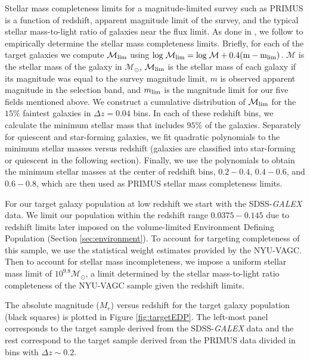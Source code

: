 \documentclass{emulateapj}
\begin{document}
Stellar mass completeness limits for a magnitude-limited 
survey such as PRIMUS is a function of redshift, apparent 
magnitude limit of the survey, and the typical stellar 
mass-to-light ratio of galaxies near the flux limit. As done 
in \cite{Moustakas:2013aa}, we follow \cite{Pozzetti:2010aa} 
to empirically determine the stellar mass completeness limits.
Briefly, for each of the target galaxies we compute 
$\mathcal{M}_{\rm{lim}}$ using $\rm{log} \; \mathcal{M}_{\rm{lim}} = \rm{log} \; \mathcal{M} + 0.4 ( m - m_{\rm{lim}})$.
$\mathcal{M}$ is the stellar mass of the galaxy in $\mathcal{M_{\odot}}$, 
$\mathcal{M}_{\rm{lim}}$ is the stellar mass of each galaxy 
if its magnitude was equal to the survey magnitude limit, 
$m$ is observed apparent magnitude in the selection band, 
and $m_{\rm{lim}}$ is the magnitude limit for our five 
fields mentioned above. We construct a cumulative 
distribution of $\mathcal{M}_{\rm{lim}}$ for the $15\%$ 
faintest galaxies in $\Delta z=0.04$ bins. In each of these 
redshift bins, we calculate the minimum stellar mass that 
includes $95 \%$ of the galaxies. Separately for quiescent 
and star-forming galaxies, we fit quadratic polynomials to 
the minimum stellar masses versus redshift (galaxies are 
classified into star-forming or quiescent in the following section).
Finally, we use the polynomials to obtain the minimum stellar 
masses at the center of redshift bins, $0.2-0.4$, $0.4-0.6$, 
and $0.6-0.8$, which are then used as PRIMUS stellar mass
completeness limits. 

For our target galaxy population at low redshift we start with 
the SDSS-{\em GALEX} data. We limit our population within 
the redshift range $0.0375-0.145$ due to redshift limits later 
imposed on the volume-limited Environment Defining Population 
(Section \ref{sec:environment}). To account for targeting 
completeness of this sample, we use the statistical weight 
estimates provided by the NYU-VAGC. Then to account for 
stellar mass incompleteness, we impose a uniform stellar mass 
limit of $10^9.8 \mathcal{M}_{\odot}$, a limit determined by the 
stellar mass-to-light ratio completeness of the NYU-VAGC 
sample given the redshift limits. 

The absolute magnitude ($M_{r}$) versus redshift for the 
target galaxy population (black squares) is plotted in Figure 
\ref{fig:targetEDP}. The left-most panel corresponds to the
target sample derived from the SDSS-{\em GALEX} data and
the rest correspond to the target sample derived from the 
PRIMUS data divided in bins with $\Delta z \sim 0.2$. 
\end{document}
